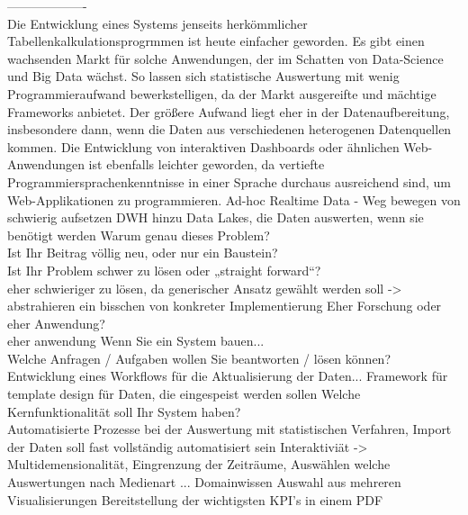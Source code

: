 -------------------\\
Die Entwicklung eines Systems jenseits herkömmlicher Tabellenkalkulationsprogrmmen ist heute einfacher geworden. Es gibt einen wachsenden Markt für
solche Anwendungen, der im Schatten von Data-Science und Big Data wächst. So lassen sich statistische Auswertung mit wenig Programmieraufwand bewerkstelligen, da
der Markt ausgereifte und mächtige Frameworks anbietet. Der größere Aufwand liegt eher in der Datenaufbereitung, insbesondere dann, wenn die
Daten aus verschiedenen heterogenen Datenquellen kommen. Die Entwicklung von interaktiven Dashboards oder ähnlichen Web-Anwendungen ist ebenfalls leichter geworden, da vertiefte
Programmiersprachenkenntnisse in einer Sprache durchaus ausreichend sind, um Web-Applikationen zu programmieren.
Ad-hoc Realtime Data - Weg bewegen von schwierig aufsetzen DWH hinzu Data Lakes, die Daten auswerten, wenn sie benötigt werden
Warum genau dieses Problem?\\
Ist Ihr Beitrag völlig neu, oder nur ein Baustein?\\
Ist Ihr Problem schwer zu lösen oder „straight forward“?\\
eher schwieriger zu lösen, da generischer Ansatz gewählt werden soll -> abstrahieren ein bisschen von konkreter Implementierung
Eher Forschung oder eher Anwendung?\\
eher anwendung
Wenn Sie ein System bauen...\\
Welche Anfragen / Aufgaben wollen Sie beantworten / lösen können?\\
Entwicklung eines Workflows für die Aktualisierung der Daten...
Framework für template design für Daten, die eingespeist werden sollen
Welche Kernfunktionalität soll Ihr System haben?\\
Automatisierte Prozesse bei der Auswertung mit statistischen Verfahren, Import der Daten soll fast vollständig automatisiert sein
Interaktiviät -> Multidemensionalität, Eingrenzung der Zeiträume, Auswählen welche Auswertungen nach Medienart ... Domainwissen
Auswahl aus mehreren Visualisierungen
Bereitstellung der wichtigsten KPI's in einem PDF

